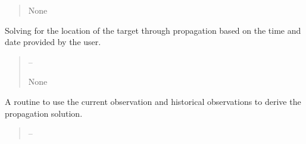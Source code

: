 \documentclass[letterpaper,11pt,english]{sphinxmanual}
\begin{document}
\begin{savenotes}
\begin{fulllineitems}
\begin{savenotes}
\begin{fulllineitems}
\begin{quote}
\begin{description}
\sphinxAtStartPar
None

\end{description}\end{quote}

\end{fulllineitems}\end{savenotes}


\begin{savenotes}\begin{fulllineitems}
\label{\detokenize{code/opihiexarata.gui.manual:opihiexarata.gui.manual.OpihiManualWindow.__connect_push_button_propagate_custom_solve}}
\pysigstartsignatures
{}
\pysigstopsignatures
\sphinxAtStartPar
Solving for the location of the target through propagation based on
the time and date provided by the user.
\begin{quote}\begin{description}
\sphinxAtStartPar
{} – 

\sphinxAtStartPar
None

\end{description}\end{quote}

\end{fulllineitems}\end{savenotes}


\begin{savenotes}\begin{fulllineitems}
\label{\detokenize{code/opihiexarata.gui.manual:opihiexarata.gui.manual.OpihiManualWindow.__connect_push_button_propagate_solve_propagation}}
\pysigstartsignatures
{}
\pysigstopsignatures
\sphinxAtStartPar
A routine to use the current observation and historical observations
to derive the propagation solution.
\begin{quote}\begin{description}
\sphinxAtStartPar
{} – 


\end{description}
\end{quote}
\end{fulllineitems}
\end{savenotes}
\end{fulllineitems}
\end{savenotes}
\end{document}
